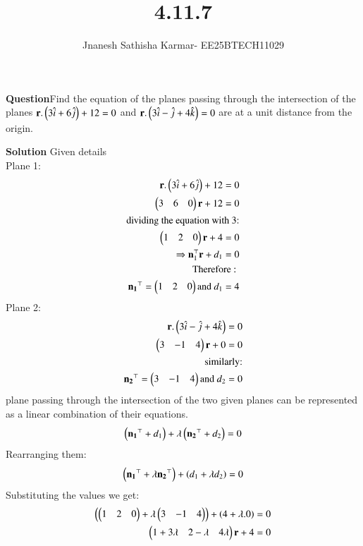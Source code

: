 \documentclass[journal]{IEEEtran}
\theoremstyle{remark}
\begin{document}
\setlength{\abovedisplayskip}{0pt}
\setlength{\belowdisplayskip}{0pt}
\setlength{\abovedisplayshortskip}{0pt}
\setlength{\belowdisplayshortskip}{0pt}

\onecolumn

\title{4.11.7}
\author{Jnanesh Sathisha Karmar- EE25BTECH11029}
\maketitle


\renewcommand{\thefigure}{\theenumi}
\renewcommand{\thetable}{\theenumi}
\textbf{Question}Find the equation of the planes passing through the intersection of the planes $\mathbf{r}.\left(3\hat{i}+6\hat{j}\right)+12=0$ and $\mathbf{r}.\left(3\hat{i}-\hat{j}+4\hat{k}\right)=0$ are at a unit distance from the origin.

\textbf{Solution} Given details\\Plane 1:
\begin{align}
   \mathbf{r}.\left(3\hat{i}+6\hat{j}\right)+12=0\\
   \begin{pmatrix}3&6&0\end{pmatrix}\mathbf{r}+12=0\\
   \text{dividing the equation with 3:}\\
   \begin{pmatrix}1&2&0\end{pmatrix}\mathbf{r}+4=0\\
   \Rightarrow \mathbf{n}_1^{\top}\mathbf{r}+d_1=0\\
   \text{Therefore :      }\\ \mathbf{n_1}^{\top}=\begin{pmatrix}1 & 2 &0\end{pmatrix} \text{and}\  d_1=4
\end{align}
Plane 2:
\begin{align}
    \mathbf{r}.\left(3\hat{i}-\hat{j}+4\hat{k}\right)=0\\
    \begin{pmatrix}3 & -1 & 4\end{pmatrix}\mathbf{r}+0=0\\
    \text{similarly:}\\
    \mathbf{n_2}^{\top}=\begin{pmatrix}3 & -1 & 4\end{pmatrix} \text{and}\ d_2=0
\end{align}
plane passing through the intersection of the two given planes can be represented as a linear combination of their equations.
\begin{align}
    \left(\mathbf{n_1}^{\top}+d_1\right)+\lambda\left(\mathbf{n_2}^{\top}+d_2\right)=0
\end{align}
Rearranging them:
\begin{align}
    \left(\mathbf{n_1}^{\top}+\lambda\mathbf{n_2}^{\top}\right)+\left(d_1+ \lambda d_2\right)=0
\end{align}
Substituting the values we get:
\begin{align}
    \left(\begin{pmatrix}1 & 2 & 0\end{pmatrix} + \lambda\begin{pmatrix}3 & -1 & 4\end{pmatrix}\right)+\left(4+\lambda.0\right)=0\\
    \begin{pmatrix}1+3\lambda&2-\lambda&4\lambda\end{pmatrix}\mathbf{r}+4=0
\end{align}
\end{document}

